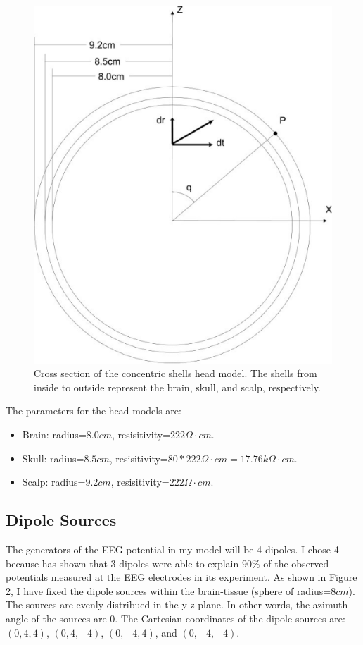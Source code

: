 \documentclass{article}
\begin{document}
\begin{figure}
    \begin{center}
        \includegraphics[scale=0.3]{concentric_shells.png}
        \caption{Cross section of the concentric shells head model. The shells from inside to outside represent the brain, skull, and scalp, respectively.}
    \end{center}
\end{figure}

The parameters for the head models are:
\begin{itemize}
    \item Brain: radius=$8.0cm$, resisitivity=$222\Omega\cdot cm$.
    \item Skull: radius=$8.5cm$, resisitivity=$80*222\Omega\cdot cm=17.76k\Omega\cdot cm$.
    \item Scalp: radius=$9.2cm$, resisitivity=$222\Omega\cdot cm$.
\end{itemize}

\subsection{Dipole Sources}
The generators of the EEG potential in my model will be 4 dipoles. I chose 4 because \cite{3dipole} has shown that 3 dipoles were able to explain $90\%$ of the observed potentials measured at the EEG electrodes in its experiment. As shown in Figure 2, I have fixed the dipole sources within the brain-tissue (sphere of radius=$8cm$). The sources are evenly distribued in the y-z plane. In other words, the azimuth angle of the sources are 0. The Cartesian coordinates of the dipole sources are: $(0,4,4)$, $(0,4,-4)$, $(0,-4,4)$, and $(0,-4,-4)$.
\end{document}
